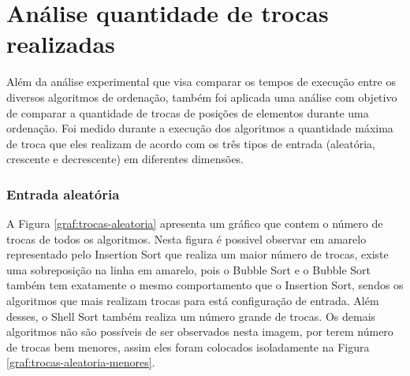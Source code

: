 \documentclass[conference,onecolumn]{IEEEtran}
\begin{document}
\section{Análise quantidade de trocas realizadas}

Além da análise experimental que visa comparar os tempos de execução entre os diversos algoritmos de ordenação, também foi aplicada uma análise com objetivo de comparar a quantidade de trocas de posições de elementos durante uma ordenação. Foi medido durante a execução dos algoritmos a quantidade máxima de troca que eles realizam de acordo com os três tipos de entrada (aleatória, crescente e decrescente) em diferentes dimensões.

\subsubsection{Entrada aleatória}

A Figura \ref{graf:trocas-aleatoria} apresenta um gráfico que contem o número de trocas de todos os algoritmos. Nesta figura é possivel observar em amarelo representado pelo Insertion Sort que realiza um maior número de trocas, existe uma sobreposição na linha em amarelo, pois o Bubble Sort e o Bubble Sort também tem exatamente o mesmo comportamento que o Insertion Sort, sendos os algoritmos que mais realizam trocas para está configuração de entrada. Além desses, o Shell Sort também realiza um número grande de trocas. Os demais algoritmos não são possíveis de ser observados nesta imagem, por terem número de trocas bem menores, assim eles foram colocados isoladamente na Figura \ref{graf:trocas-aleatoria-menores}.
\end{document}

